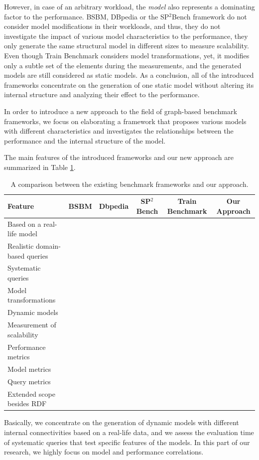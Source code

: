However, in case of an arbitrary workload, the \textit{model} also represents a dominating factor to the performance. BSBM, DBpedia or the SP$^2$Bench framework do not consider model modifications in their workloads, and thus, they do not investigate the impact of various model characteristics to the performance, they only generate the same structural model in different sizes to measure scalability. Even though Train Benchmark considers model transformations, yet, it modifies only a subtle set of the elements during the measurements, and the generated models are still considered as static models. As a conclusion, all of the introduced frameworks concentrate on the generation of one static model without altering its internal structure and analyzing their effect to the performance.

In order to introduce a new approach to the field of graph-based benchmark frameworks, we focus on elaborating a framework that proposes various models with different characteristics and investigates the relationships between the performance and the internal structure of the model.

The main features of the introduced frameworks and our new approach are summarized in Table \ref{tab:framework_features}.
\begin{table}[ht]
	\footnotesize
	\centering
	\begin{tabular}{l c c c c c}
		\toprule
		Feature & BSBM & Dbpedia & SP$^2$Bench & Train Benchmark & Our Approach\\ \hline
		\midrule
		Based on a real-life model &  & \textbullet & \textbullet & & \textbullet  \\ \hline
		Realistic domain-based queries & \textbullet & \textbullet &  &  & \\ \hline
		Systematic queries  & &  & \textbullet & & \textbullet \\ \hline
		Model transformations &  &  &  & \textbullet & \\ \hline
		Dynamic models &  &  &  & & \textbullet \\ \hline
		Measurement of scalability  & \textbullet & \textbullet & \textbullet & \textbullet & \textbullet\\ \hline
		Performance metrics  & \textbullet & \textbullet & \textbullet & &  \\ \hline
		Model metrics &  &  &  & & \textbullet \\ \hline
		Query metrics &  &  &  & & \textbullet \\ \hline
		Extended scope besides RDF & &  &  & \textbullet & \\ \hline
		\bottomrule
	\end{tabular}
	\caption{A comparison between the existing benchmark frameworks and our approach.}
	\label{tab:framework_features}
\end{table}

Basically, we concentrate on the generation of dynamic models with different internal connectivities based on a real-life data, and we assess the evaluation time of systematic queries that test specific features of the models. In this part of our research, we highly focus on model and performance correlations.